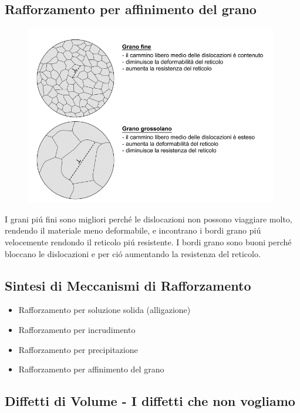\documentclass{article}
\begin{document}
        \subsection{Rafforzamento per affinimento del grano}
            \begin{figure}
                \centering
                \includegraphics{Differenza dimensioni grnao.png}
            \end{figure}
            I grani pi\'u fini sono migliori perch\'e le dislocazioni non possono viaggiare molto, rendendo il materiale meno deformabile, e incontrano i bordi grano pi\'u velocemente rendondo il reticolo pi\'u resistente. I bordi grano sono buoni perch\'e bloccano le dislocazioni e per ci\'o aumentando la resistenza del reticolo.
        \subsection{Sintesi di Meccanismi di Rafforzamento}
            \begin{itemize}
                \item Rafforzamento per soluzione solida (alligazione)
                \item Rafforzamento per incrudimento
                \item Rafforzamento per precipitazione
                \item Rafforzamento per affinimento del grano
            \end{itemize}
        \subsection{Diffetti di Volume - I diffetti che non vogliamo}
\end{document}
